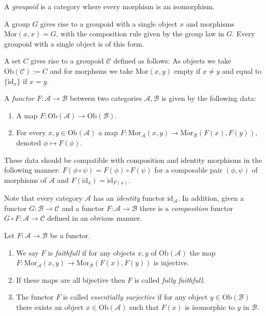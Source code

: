 \begin{definition} 
\label{definition-groupoid}
A {\it groupoid} is a category where every morphism is an isomorphism.
\end{definition}

\begin{example}
\label{example-group-groupoid}
A group $G$ gives rise to a groupoid with a single object $x$
and morphisms $\text{Mor}(x,x) = G$, with the composition rule
given by the group law in $G$. Every groupoid with a single
object is of this form.
\end{example}

\begin{example}
\label{example-set-groupoid}
A set $C$ gives rise to a groupoid $\mathcal{C}$ defined as follows:
As objects we take $\text{Ob}(\mathcal{C}) := C$ and for morphsms
we take $\text{Mor}(x,y)$ empty if $x\neq y$ and equal to
$\{\text{id}_x\}$ if $x=y$.
\end{example}

\begin{definition}
\label{definition-functor}
A {\it functor} $F : \mathcal{A} \to \mathcal{B}$
between two categories $\mathcal{A}, \mathcal{B}$ is given by the
following data:
\begin{enumerate}
\item A map $F : \text{Ob}(\mathcal{A}) \to \text{Ob}(\mathcal{B})$.
\item For every $x,y \in \text{Ob}(\mathcal{A})$ a map
$F : \text{Mor}_\mathcal{A}(x,y) \to \text{Mor}_\mathcal{B}(F(x), F(y))$,
denoted $\phi \mapsto F(\phi)$.
\end{enumerate}
These data should be compatible with composition and identity morphisms
in the following manner: $F(\phi \circ \psi) =
F(\phi) \circ F(\psi)$ for a composable pair $(\phi, \psi)$ of
morphisms of $\mathcal{A}$ and $F(\text{id}_x) = \text{id}_{F(x)}$.
\end{definition}

\noindent
Note that every category $\mathcal{A}$ has an
{\it identity} functor $\text{id}_\mathcal{A}$.
In addition, given a functor $G : \mathcal{B} \to \mathcal{C}$
and a functor $F : \mathcal{A} \to \mathcal{B}$ there is
a {\it composition} functor $G \circ F : \mathcal{A} \to \mathcal{C}$
defined in an obvious manner.

\begin{definition}
\label{definition-faithfull}
Let $F : \mathcal{A} \to \mathcal{B}$ be a functor.
\begin{enumerate}
\item We say $F$ is {\it faithfull} if 
for any objects $x,y$ of $\text{Ob}(\mathcal{A})$ the map
$F : \text{Mor}_\mathcal{A}(x,y) \to \text{Mor}_\mathcal{B}(F(x), F(y))$
is injective.
\item If these maps are all bijective then $F$ is called
{\it fully faithfull}.
\item
The functor $F$ is called {\it essentially surjective} if for any 
object $y \in \text{Ob}(\mathcal{B})$ there exists an object
$x \in \text{Ob}(\mathcal{A})$ such that $F(x)$ is isomorphic to $y$ in
$\mathcal{B}$.
\end{enumerate}
\end{definition}

